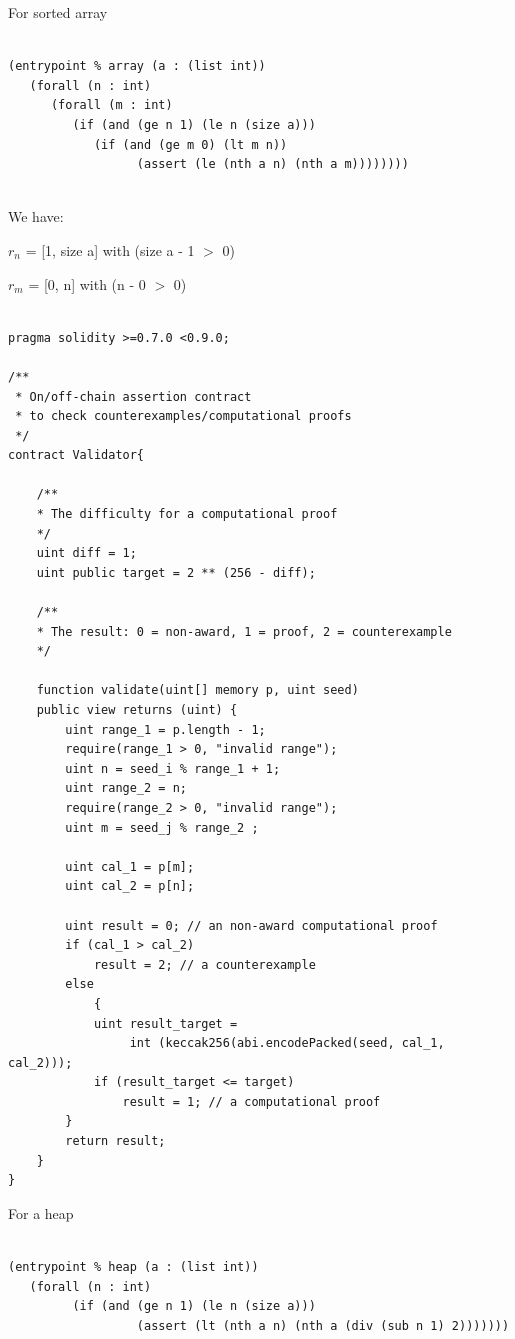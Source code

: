 \documentclass[runningheads]{llncs}
\begin{document}
For sorted array

\begin{lstlisting}[numbers=none]

(entrypoint % array (a : (list int))
   (forall (n : int)
      (forall (m : int)
         (if (and (ge n 1) (le n (size a)))
            (if (and (ge m 0) (lt m n))
                  (assert (le (nth a n) (nth a m))))))))
                  
\end{lstlisting}

\noindent We have:

$r_{n}$ = [1, size a] with (size a - 1 $>$ 0)

$r_{m}$ = [0, n] with (n - 0 $>$ 0)

\begin{lstlisting}[numbers=none]

pragma solidity >=0.7.0 <0.9.0;

/**
 * On/off-chain assertion contract 
 * to check counterexamples/computational proofs
 */
contract Validator{

    /**
    * The difficulty for a computational proof
    */
    uint diff = 1;
    uint public target = 2 ** (256 - diff); 

    /**
    * The result: 0 = non-award, 1 = proof, 2 = counterexample
    */

    function validate(uint[] memory p, uint seed)
    public view returns (uint) {
        uint range_1 = p.length - 1; 
        require(range_1 > 0, "invalid range");
        uint n = seed_i % range_1 + 1;
        uint range_2 = n;
        require(range_2 > 0, "invalid range");
        uint m = seed_j % range_2 ;
        
        uint cal_1 = p[m];
        uint cal_2 = p[n];

        uint result = 0; // an non-award computational proof 
        if (cal_1 > cal_2)  
            result = 2; // a counterexample
        else 
            {
            uint result_target = 
                 int (keccak256(abi.encodePacked(seed, cal_1, cal_2)));
            if (result_target <= target) 
                result = 1; // a computational proof      
        }             
        return result;           
    }
}

\end{lstlisting}

For a heap

\begin{lstlisting}[numbers=none]

(entrypoint % heap (a : (list int))
   (forall (n : int)
         (if (and (ge n 1) (le n (size a)))
                  (assert (lt (nth a n) (nth a (div (sub n 1) 2)))))))
\end{lstlisting}
\end{document}
